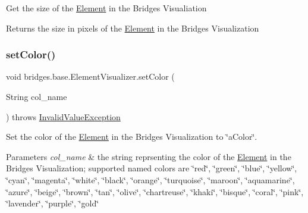 Get the size of the \mbox{\hyperlink{classbridges_1_1base_1_1_element}{Element}} in the Bridges Visualiation

\begin{DoxyReturn}{Returns}
the size in pixels of the \mbox{\hyperlink{classbridges_1_1base_1_1_element}{Element}} in the Bridges Visualization 
\end{DoxyReturn}
\mbox{\label{classbridges_1_1base_1_1_element_visualizer_ad7ff2a772741301c08943a58ffccca38}} 
\subsubsection{\texorpdfstring{set\+Color()}{setColor()}\hspace{0.1cm}{\footnotesize\ttfamily [1/3]}}
{\footnotesize\ttfamily void bridges.\+base.\+Element\+Visualizer.\+set\+Color (\begin{DoxyParamCaption}\item[{String}]{col\+\_\+name }\end{DoxyParamCaption}) throws \mbox{\hyperlink{classbridges_1_1validation_1_1_invalid_value_exception}{Invalid\+Value\+Exception}}}

Set the color of the \mbox{\hyperlink{classbridges_1_1base_1_1_element}{Element}} in the Bridges Visualization to \char`\"{}a\+Color\char`\"{}.


\begin{DoxyParams}{Parameters}
{\em col\+\_\+name} & the string reprsenting the color of the \mbox{\hyperlink{classbridges_1_1base_1_1_element}{Element}} in the Bridges Visualization; supported named colors are \char`\"{}red\char`\"{}, \char`\"{}green\char`\"{}, \char`\"{}blue\char`\"{}, \char`\"{}yellow\char`\"{}, \char`\"{}cyan\char`\"{}, \char`\"{}magenta\char`\"{}, \char`\"{}white\char`\"{}, \char`\"{}black\char`\"{}, \char`\"{}orange\char`\"{}, \char`\"{}turquoise\char`\"{}, \char`\"{}maroon\char`\"{}, \char`\"{}aquamarine\char`\"{}, \char`\"{}azure\char`\"{}, \char`\"{}beige\char`\"{}, \char`\"{}brown\char`\"{}, \char`\"{}tan\char`\"{}, \char`\"{}olive\char`\"{}, \char`\"{}chartreuse\char`\"{}, \char`\"{}khaki\char`\"{}, \char`\"{}bisque\char`\"{}, \char`\"{}coral\char`\"{}, \char`\"{}pink\char`\"{}, \char`\"{}lavender\char`\"{}, \char`\"{}purple\char`\"{}, \char`\"{}gold\char`\"{} \\
\hline
\end{DoxyParams}
\mbox{\label{classbridges_1_1base_1_1_element_visualizer_a84fad1c8abe43b20c68c1800d7630918}} 
